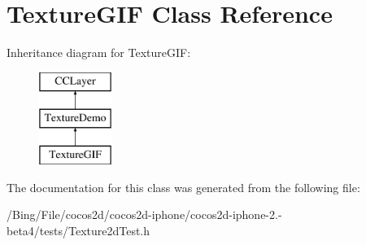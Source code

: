 \hypertarget{interface_texture_g_i_f}{\section{Texture\-G\-I\-F Class Reference}
\label{interface_texture_g_i_f}
}
Inheritance diagram for Texture\-G\-I\-F\-:\begin{figure}[H]
\begin{center}
\leavevmode
\includegraphics[height=3.000000cm]{interface_texture_g_i_f}
\end{center}
\end{figure}


The documentation for this class was generated from the following file\-:\begin{DoxyCompactItemize}
\item 
/\-Bing/\-File/cocos2d/cocos2d-\/iphone/cocos2d-\/iphone-\/2.-\/beta4/tests/Texture2d\-Test.\-h\end{DoxyCompactItemize}
